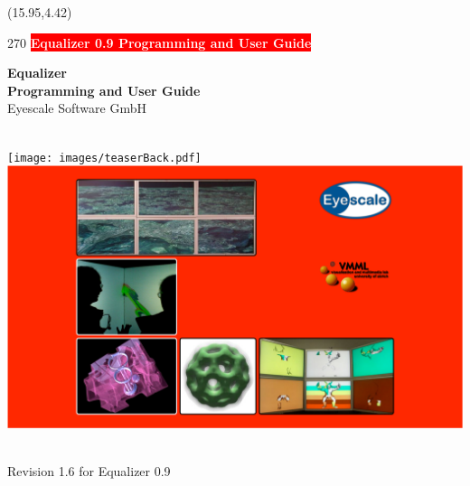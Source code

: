 \documentclass[10pt]{scrartcl}
\newcommand{\boxwidth}{5in}
\newcommand{\spacewidth}{604pt}
\begin{document}
\thispagestyle{empty}

\begin{textblock}{}(15.95,4.42)
  \begin{rotate}{270}
    \setlength{\fboxsep}{2.3mm} 
    \colorbox{red}{\textsf{\bfseries\Large\textcolor{white}{{\hspace{8.3mm}Equalizer
            0.9 Programming and User Guide\hspace{8.3mm}}}}}
  \end{rotate}
\end{textblock}

\vfill
\parbox[t]{\spacewidth}{\hfill}
\parbox[t]{\boxwidth}{
  \center
  \textsf{\textbf{\huge Equalizer\\Programming and User Guide}}\\[\bigskipamount]
  {\Large Eyescale Software GmbH}
}\\
\vfill
\hspace{-128pt}
  \texttt{[image: images/teaserBack.pdf]}
  \hspace{16.38pt}
  \includegraphics[width=604pt]{images/teaser.pdf}
\\
\vfill
\parbox[t]{\spacewidth}{\hfill}
\parbox[t]{\boxwidth}{ \\\vspace{1cm}
  {\Large Revision 1.6 for Equalizer 0.9}\\[\medskipamount]
}
\end{document}
